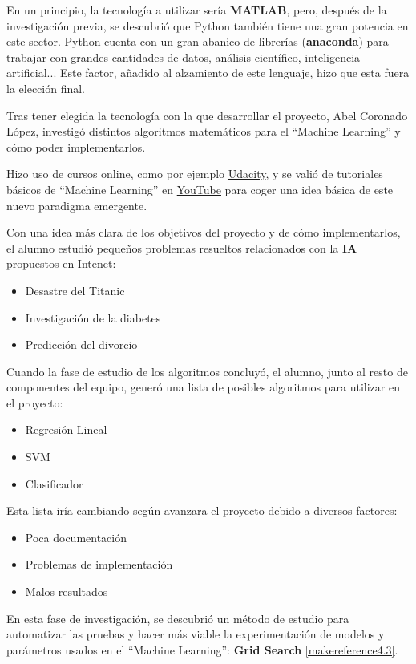En un principio, la tecnología a utilizar sería \textbf{MATLAB}, pero, después de la investigación previa, se descubrió que Python también tiene una gran potencia en este sector. Python cuenta con un gran abanico de librerías (\textbf{anaconda}) para trabajar con grandes cantidades de datos, análisis científico, inteligencia artificial... Este factor, añadido al alzamiento de este lenguaje, hizo que esta fuera la elección final.

Tras tener elegida la tecnología con la que desarrollar el proyecto, Abel Coronado López, investigó distintos algoritmos matemáticos para el ``Machine Learning'' y cómo poder implementarlos.

Hizo uso de cursos online, como por ejemplo \href{https://www.udacity.com}{Udacity}, y se valió de tutoriales básicos de ``Machine Learning'' en \href{https://www.youtube.com}{YouTube} para coger una idea básica de este nuevo paradigma emergente.

Con una idea más clara de los objetivos del proyecto y de cómo implementarlos, el alumno estudió pequeños problemas resueltos relacionados con la \textbf{IA} propuestos en Intenet:

\begin{itemize}
\item Desastre del Titanic
\item Investigación de la diabetes
\item Predicción del divorcio
\end{itemize}

Cuando la fase de estudio de los algoritmos concluyó, el alumno, junto al resto de componentes del equipo, generó una lista de posibles algoritmos para utilizar en el proyecto: 

\begin{itemize}
\item Regresión Lineal
\item SVM
\item Clasificador
\end{itemize}

Esta lista iría cambiando según avanzara el proyecto debido a diversos factores:

\begin{itemize}
\item Poca documentación
\item Problemas de implementación
\item Malos resultados
\end{itemize}

En esta fase de investigación, se descubrió un método de estudio para automatizar las pruebas y hacer más viable la experimentación de modelos y parámetros usados en el ``Machine Learning'': \textbf{Grid Search} \ref{makereference4.3}.

